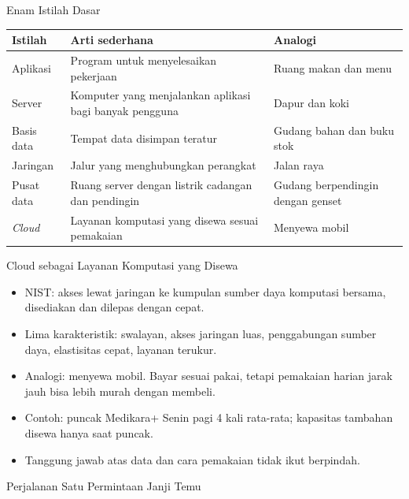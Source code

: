 \documentclass[aspectratio=169, table, 12pt]{beamer}
\begin{document}
\begin{frame}{Enam Istilah Dasar}
  \footnotesize
  \begin{tabularx}{\textwidth}{>{\raggedright\arraybackslash}p{2cm}
                               >{\raggedright\arraybackslash}X
                               >{\raggedright\arraybackslash}p{3.3cm}}
    \hline
    \textbf{Istilah} & \textbf{Arti sederhana} & \textbf{Analogi} \\
    \hline
    Aplikasi & Program untuk menyelesaikan pekerjaan & Ruang makan dan menu \\
    \hline
    Server & Komputer yang menjalankan aplikasi bagi banyak pengguna & Dapur dan koki \\
    \hline
    Basis data & Tempat data disimpan teratur & Gudang bahan dan buku stok \\
    \hline
    Jaringan & Jalur yang menghubungkan perangkat & Jalan raya \\
    \hline
    Pusat data & Ruang server dengan listrik cadangan dan pendingin & Gudang
      berpendingin dengan genset \\
    \hline
    \textit{Cloud} & Layanan komputasi yang disewa sesuai pemakaian & Menyewa mobil \\
    \hline
  \end{tabularx}
\end{frame}

\begin{frame}{Cloud sebagai Layanan Komputasi yang Disewa}
  \begin{itemize}
    \item NIST: akses lewat jaringan ke kumpulan sumber daya komputasi bersama,
          disediakan dan dilepas dengan cepat.
    \item Lima karakteristik: swalayan, akses jaringan luas, penggabungan sumber
          daya, elastisitas cepat, layanan terukur.
    \item Analogi: menyewa mobil. Bayar sesuai pakai, tetapi pemakaian harian jarak
          jauh bisa lebih murah dengan membeli.
    \item Contoh: puncak Medikara+ Senin pagi 4 kali rata-rata; kapasitas tambahan
          disewa hanya saat puncak.
    \item Tanggung jawab atas data dan cara pemakaian tidak ikut berpindah.
  \end{itemize}
\end{frame}

\begin{frame}{Perjalanan Satu Permintaan Janji Temu}
  \centering
  \resizebox{0.88\textwidth}{!}{}
\end{frame}
\end{document}
